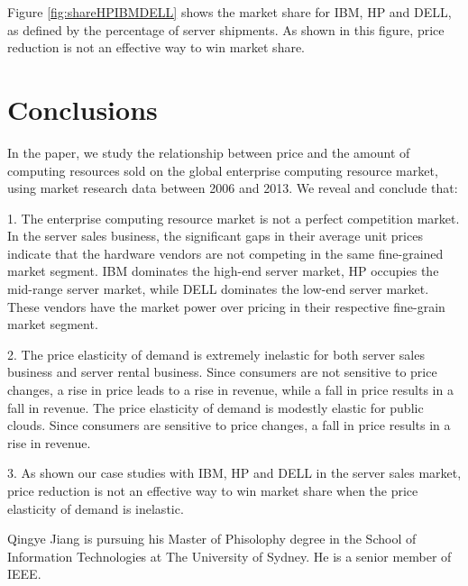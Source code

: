 \documentclass[10pt,journal,cspaper,compsoc]{IEEEtran}
\begin{document}
Figure \ref{fig:shareHPIBMDELL} shows the market share for IBM, HP and DELL, as defined by the percentage of server shipments. As shown in this figure, price reduction is not an effective way to win market share.

\section{Conclusions}
\label{sec:conclusions}

In the paper, we study the relationship between price and the amount of computing resources sold on the global enterprise computing resource market, using market research data between 2006 and 2013. We reveal and conclude that:


1. The enterprise computing resource market is not a perfect competition market. In the server sales business, the significant gaps in their average unit prices indicate that the hardware vendors are not competing in the same fine-grained market segment. IBM dominates the high-end server market, HP occupies the mid-range server market, while DELL dominates the low-end server market. These vendors have the market power over pricing in their respective fine-grain market segment.

2. The price elasticity of demand is extremely inelastic for both server sales business and server rental business. Since consumers are not sensitive to price changes, a rise in price leads to a rise in revenue, while a fall in price results in a fall in revenue. The price elasticity of demand is modestly elastic for public clouds. Since consumers are sensitive to price changes, a fall in price results in a rise in revenue.

3. As shown our case studies with IBM, HP and DELL in the server sales market, price reduction is not an effective way to win market share when the price elasticity of demand is inelastic. 


  


\begin{IEEEbiographynophoto}{Qingye Jiang}
is pursuing his Master of Phisolophy degree in the School of Information Technologies at The University of Sydney. He is a senior member of IEEE.
\end{IEEEbiographynophoto}
\end{document}
